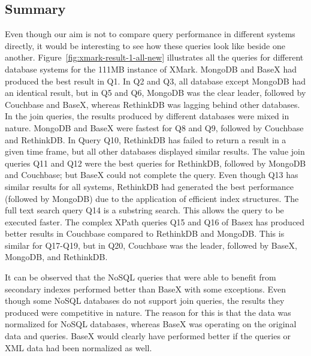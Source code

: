 \subsection{Summary}
Even though our aim is not to compare query performance in different systems directly, it would be interesting to see how these queries look like beside one another. Figure~\ref{fig:xmark-result-1-all-new} illustrates all the queries for different database systems for the 111MB instance of XMark. MongoDB and BaseX had produced the best result in Q1. In Q2 and Q3, all database except MongoDB had an identical result, but in Q5 and Q6, MongoDB was the clear leader, followed by Couchbase and BaseX, whereas RethinkDB was lagging behind other databases. In the join queries, the results produced by different databases were mixed in nature. MongoDB and BaseX were fastest for Q8 and Q9, followed by Couchbase and RethinkDB. In Query Q10, RethinkDB has failed to return a result in a given time frame, but all other databases displayed similar results. The value join queries Q11 and Q12 were the best queries for RethinkDB, followed by MongoDB and Couchbase; but BaseX could not complete the query. Even though Q13 has similar results for all systems, RethinkDB had generated the best performance (followed by MongoDB) due to the application of efficient index structures. The full text search query Q14 is a substring search. This allows the query to be executed faster. The complex XPath queries Q15 and Q16 of Basex has produced better results in Couchbase compared to RethinkDB and MongoDB. This is similar for Q17-Q19, but in Q20, Couchbase was the leader, followed by BaseX, MongoDB, and RethinkDB. 

It can be observed that the NoSQL queries that were able to benefit from secondary indexes performed better than BaseX with some exceptions. Even though some NoSQL databases do not support join queries, the results they produced were competitive in nature. The reason for this is that the data was normalized for NoSQL databases, whereas BaseX was operating on the original data and queries. BaseX would clearly have performed better if the queries or XML data had been normalized as well.

